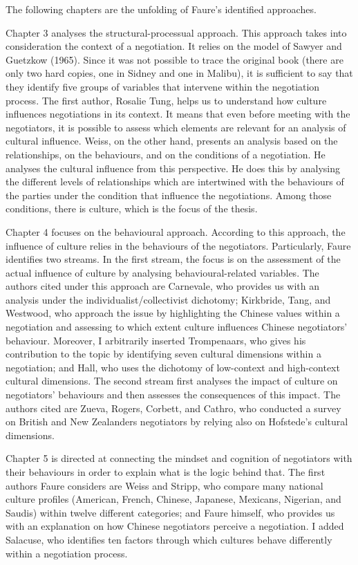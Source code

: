 ﻿\documentclass[../main.tex]{subfiles}
\begin{document}
The following chapters are the unfolding of Faure's identified approaches.

Chapter 3 analyses the structural-processual approach. This approach takes into consideration the context of a negotiation. It relies on the model of Sawyer and Guetzkow (1965). Since it was not possible to trace the original book (there are only two hard copies, one in Sidney and one in Malibu), it is sufficient to say that they identify five groups of variables that intervene within the negotiation process.
The first author, Rosalie Tung, helps us to understand how culture influences negotiations in its context. It means that even before meeting with the negotiators, it is possible to assess which elements are relevant for an analysis of cultural influence.
Weiss, on the other hand, presents an analysis based on the relationships, on the behaviours, and on the conditions of a negotiation. He analyses the cultural influence from this perspective. He does this by analysing the different levels of relationships which are intertwined with the behaviours of the parties under the condition that influence the negotiations. Among those conditions, there is culture, which is the focus of the thesis.

Chapter 4 focuses on the behavioural approach. According to this approach, the influence of culture relies in the behaviours of the negotiators.
Particularly, Faure identifies two streams.
In the first stream, the focus is on the assessment of the actual influence of culture by analysing behavioural-related variables. The authors cited under this approach are Carnevale, who provides us with an analysis under the individualist/collectivist dichotomy; Kirkbride, Tang, and Westwood, who approach the issue by highlighting the Chinese values within a negotiation and assessing to which extent culture influences Chinese negotiators' behaviour. Moreover, I arbitrarily inserted Trompenaars, who gives his contribution to the topic by identifying seven cultural dimensions within a negotiation; and Hall, who uses the dichotomy of low-context and high-context cultural dimensions.
The second stream first analyses the impact of culture on negotiators' behaviours and then assesses the consequences of this impact. The authors cited are Zueva, Rogers, Corbett, and Cathro, who conducted a survey on British and New Zealanders negotiators by relying also on Hofstede's cultural dimensions.

Chapter 5 is directed at connecting the mindset and cognition of negotiators with their behaviours in order to explain what is the logic behind that.
The first authors Faure considers are Weiss and Stripp, who compare many national culture profiles (American, French, Chinese, Japanese, Mexicans, Nigerian, and Saudis) within twelve different categories; and Faure himself, who provides us with an explanation on how Chinese negotiators perceive a negotiation. I added Salacuse, who identifies ten factors through which cultures behave differently within a negotiation process.
\end{document}
